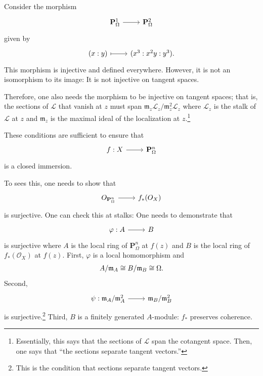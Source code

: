 \documentclass [11 pt, oneside] {article}
\begin{document}
\begin{example}\label{}\text{}
Consider the morphism
\[
\begin{tikzcd}
	\mathbf{P}^1_\Omega\ar[r]&\mathbf{P}^2_\Omega
\end{tikzcd}
\]
given by 
\[
\begin{tikzcd}
	(x:y) \ar[r,mapsto] & (x^3:x^2y:y^3).
\end{tikzcd}
\]
This morphism is injective and defined everywhere.
However, it is not an isomorphism to its image: It is not injective on tangent spaces.
\end{example}

Therefore, one also needs the morphism to be injective on tangent spaces; that is, the sections of $\mathscr{L}$ that vanish at $z$ must span $\mathfrak{m}_z\mathscr{L}_z/\mathfrak{m}_z^2\mathscr{L}_z$ where $\mathscr{L}_z$ is the stalk of $\mathscr{L}$ at $z$ and $\mathfrak{m}_z$ is the maximal ideal of the localization at $z$.\footnote{Essentially, this says that the sections of $\mathscr{L}$ span the cotangent space. Then, one says that ``the sections separate tangent vectors.''}

These conditions are sufficient to ensure that
\[
\begin{tikzcd}
	f:X\ar[r]&\mathbf{P}^n_\Omega
\end{tikzcd}
\]
is a closed immersion.

To sees this, one needs to show that
\[
\begin{tikzcd}
	\mathscr{O}_{\mathbf{P}^n_\Omega} \ar[r]& f_*(\mathscr{O}_X)
\end{tikzcd}
\]
is surjective. One can check this at stalks: One needs to demonstrate that 
\[
\begin{tikzcd}
	\varphi: A\ar[r]&B
\end{tikzcd}
\]
is surjective where $A$ is the local ring of $\mathbf{P}^n_\Omega$ at $f(z)$ and $B$ is the local ring of $f_*(\mathscr{O}_X)$ at $f(z)$.
First, $\varphi$ is a local homomorphism and
\begin{align*}
	A/\mathfrak{m}_A \cong B/\mathfrak{m}_B \cong \Omega.
\end{align*}
Second,
\[
\begin{tikzcd}
	\psi:\mathfrak{m}_A/\mathfrak{m}_A^2 \ar[r]&\mathfrak{m}_B/\mathfrak{m}_B^2
\end{tikzcd}
\]
is surjective.\footnote{This is the condition that sections separate tangent vectors.} Third, $B$ is a finitely generated $A$-module: $f_*$ preserves coherence.
\end{document}
